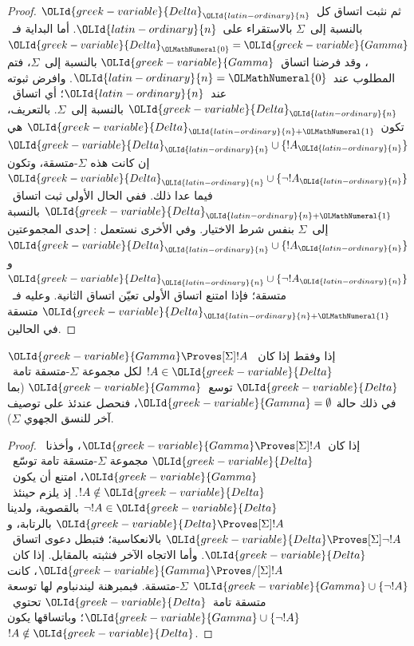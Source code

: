 \documentclass[../../../include/open-logic-section]{subfiles}
\begin{document}
\begin{proof}
ثم نثبت اتساق كل~${\OLId{greek-variable}{Delta}}_{\OLId{latin-ordinary}{n}}$ بالنسبة إلى~$\Sigma$ بالاستقراء على~${\OLId{latin-ordinary}{n}}$.
أما البداية فـ~${\OLId{greek-variable}{Delta}}_{\OLMathNumeral{0}} = {\OLId{greek-variable}{Gamma}}$، وقد فرضنا اتساق~${\OLId{greek-variable}{Gamma}}$
بالنسبة إلى~$\Sigma$، فتم المطلوب عند~${\OLId{latin-ordinary}{n}} = {\OLMathNumeral{0}}$.
وافرض ثبوته عند~${\OLId{latin-ordinary}{n}}$؛ أي اتساق~${\OLId{greek-variable}{Delta}}_{\OLId{latin-ordinary}{n}}$ بالنسبة إلى~$\Sigma$.
بالتعريف، تكون~${\OLId{greek-variable}{Delta}}_{{\OLId{latin-ordinary}{n}}+{\OLMathNumeral{1}}}$ هي
${\OLId{greek-variable}{Delta}}_{\OLId{latin-ordinary}{n}} \cup \{!A_{\OLId{latin-ordinary}{n}}\}$ إن كانت هذه $\Sigma$-متسقة،
وتكون ${\OLId{greek-variable}{Delta}}_{\OLId{latin-ordinary}{n}} \cup \{\lnot!A_{\OLId{latin-ordinary}{n}}\}$ فيما عدا ذلك.
ففي الحال الأولى ثبت اتساق~${\OLId{greek-variable}{Delta}}_{{\OLId{latin-ordinary}{n}}+{\OLMathNumeral{1}}}$ بالنسبة إلى~$\Sigma$
بنفس شرط الاختيار. وفي الأخرى نستعمل
:
إحدى المجموعتين ${\OLId{greek-variable}{Delta}}_{\OLId{latin-ordinary}{n}} \cup \{!A_{\OLId{latin-ordinary}{n}}\}$ و${\OLId{greek-variable}{Delta}}_{\OLId{latin-ordinary}{n}} \cup \{\lnot!A_{\OLId{latin-ordinary}{n}}\}$
متسقة؛ فإذا امتنع اتساق الأولى تعيّن اتساق الثانية.
وعليه فـ~${\OLId{greek-variable}{Delta}}_{{\OLId{latin-ordinary}{n}}+{\OLMathNumeral{1}}}$ متسقة في الحالين.
\end{proof}

\begin{cor}
  ${\OLId{greek-variable}{Gamma}} \Proves[\Sigma] !A$ إذا وفقط إذا كان~$!A \in {\OLId{greek-variable}{Delta}}$ لكل
  مجموعة $\Sigma$-متسقة تامة~${\OLId{greek-variable}{Delta}}$ توسع~${\OLId{greek-variable}{Gamma}}$ (بما في ذلك حالة
  ${\OLId{greek-variable}{Gamma}} = \emptyset$، فنحصل عندئذ على توصيف آخر للنسق الجهوي
  $\Sigma$).
\end{cor}

\begin{proof}
  إذا كان~${\OLId{greek-variable}{Gamma}} \Proves[\Sigma] !A$، وأخذنا~${\OLId{greek-variable}{Delta}}$ مجموعة
  $\Sigma$-متسقة تامة توسّع~${\OLId{greek-variable}{Gamma}}$، امتنع أن يكون~$!A \notin {\OLId{greek-variable}{Delta}}$.
  إذ يلزم حينئذ~$\lnot!A \in {\OLId{greek-variable}{Delta}}$ بالقصوية، ولدينا
  ${\OLId{greek-variable}{Delta}} \Proves[\Sigma] !A$ بالرتابة، و
  ${\OLId{greek-variable}{Delta}} \Proves[\Sigma] \lnot!A$ بالانعكاسية؛ فتبطل دعوى اتساق~${\OLId{greek-variable}{Delta}}$.
  وأما الاتجاه الآخر فنثبته بالمقابل. إذا كان~${\OLId{greek-variable}{Gamma}} \Proves/[\Sigma] !A$،
  كانت ${\OLId{greek-variable}{Gamma}} \cup \{\lnot!A\}$ $\Sigma$-متسقة.
  فبمبرهنة ليندنباوم لها توسعة متسقة تامة~${\OLId{greek-variable}{Delta}}$
  تحتوي~${\OLId{greek-variable}{Gamma}} \cup \{\lnot!A\}$؛ وباتساقها يكون $!A \notin {\OLId{greek-variable}{Delta}}$.
\end{proof}
\end{document}
